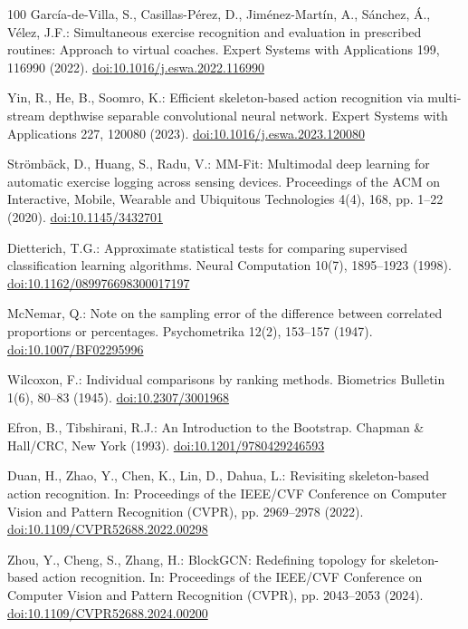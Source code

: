 \documentclass[preprint,12pt]{elsarticle}
\begin{document}
\begin{thebibliography}{100}
Garc\'{i}a-de-Villa, S., Casillas-P\'{e}rez, D., Jim\'{e}nez-Mart\'{i}n, A., S\'{a}nchez, \'{A}., V\'{e}lez, J.F.: Simultaneous exercise recognition and evaluation in prescribed routines: Approach to virtual coaches. Expert Systems with Applications 199, 116990 (2022). \href{https://doi.org/10.1016/j.eswa.2022.116990}{doi:10.1016/j.eswa.2022.116990}

Yin, R., He, B., Soomro, K.: Efficient skeleton-based action recognition via multi-stream depthwise separable convolutional neural network. Expert Systems with Applications 227, 120080 (2023). \href{https://doi.org/10.1016/j.eswa.2023.120080}{doi:10.1016/j.eswa.2023.120080}

Str\"{o}mb\"{a}ck, D., Huang, S., Radu, V.: MM-Fit: Multimodal deep learning for automatic exercise logging across sensing devices. Proceedings of the ACM on Interactive, Mobile, Wearable and Ubiquitous Technologies 4(4), 168, pp. 1--22 (2020). \href{https://doi.org/10.1145/3432701}{doi:10.1145/3432701}

Dietterich, T.G.: Approximate statistical tests for comparing supervised classification learning algorithms. Neural Computation 10(7), 1895--1923 (1998). \href{https://doi.org/10.1162/089976698300017197}{doi:10.1162/089976698300017197}

McNemar, Q.: Note on the sampling error of the difference between correlated proportions or percentages. Psychometrika 12(2), 153--157 (1947). \href{https://doi.org/10.1007/BF02295996}{doi:10.1007/BF02295996}

Wilcoxon, F.: Individual comparisons by ranking methods. Biometrics Bulletin 1(6), 80--83 (1945). \href{https://doi.org/10.2307/3001968}{doi:10.2307/3001968}

Efron, B., Tibshirani, R.J.: An Introduction to the Bootstrap. Chapman \& Hall/CRC, New York (1993). \href{https://doi.org/10.1201/9780429246593}{doi:10.1201/9780429246593}

Duan, H., Zhao, Y., Chen, K., Lin, D., Dahua, L.: Revisiting skeleton-based action recognition. In: Proceedings of the IEEE/CVF Conference on Computer Vision and Pattern Recognition (CVPR), pp. 2969--2978 (2022). \href{https://doi.org/10.1109/CVPR52688.2022.00298}{doi:10.1109/CVPR52688.2022.00298}

Zhou, Y., Cheng, S., Zhang, H.: BlockGCN: Redefining topology for skeleton-based action recognition. In: Proceedings of the IEEE/CVF Conference on Computer Vision and Pattern Recognition (CVPR), pp. 2043--2053 (2024). \href{https://doi.org/10.1109/CVPR52688.2024.00200}{doi:10.1109/CVPR52688.2024.00200}

\end{thebibliography}
\end{document}

